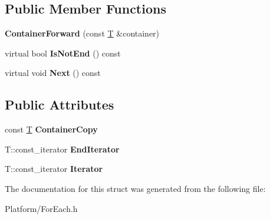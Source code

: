 \subsection*{Public Member Functions}
\begin{DoxyCompactItemize}
\item 
\mbox{\label{struct_gost_crypt_1_1_for_each_1_1_container_forward_af1bb33840d4c26adac8cb5c34d29076e}} 
{\bfseries Container\+Forward} (const \hyperlink{_stribog_8c_aba2f4c400d7a4c0bf0296be622087314}{T} \&container)
\item 
\mbox{\label{struct_gost_crypt_1_1_for_each_1_1_container_forward_a438400d1b3103255f8f26649b8903a02}} 
virtual bool {\bfseries Is\+Not\+End} () const
\item 
\mbox{\label{struct_gost_crypt_1_1_for_each_1_1_container_forward_a1488b7586769ff271884d21c1dd44a11}} 
virtual void {\bfseries Next} () const
\end{DoxyCompactItemize}
\subsection*{Public Attributes}
\begin{DoxyCompactItemize}
\item 
\mbox{\label{struct_gost_crypt_1_1_for_each_1_1_container_forward_ab4189eaa4bcb0fc968ffaf50ecbc981c}} 
const \hyperlink{_stribog_8c_aba2f4c400d7a4c0bf0296be622087314}{T} {\bfseries Container\+Copy}
\item 
\mbox{\label{struct_gost_crypt_1_1_for_each_1_1_container_forward_ae498fa2c981175a88be29f18c5fc91b7}} 
T\+::const\+\_\+iterator {\bfseries End\+Iterator}
\item 
\mbox{\label{struct_gost_crypt_1_1_for_each_1_1_container_forward_a03795c535997333feef935669327a696}} 
T\+::const\+\_\+iterator {\bfseries Iterator}
\end{DoxyCompactItemize}


The documentation for this struct was generated from the following file\+:\begin{DoxyCompactItemize}
\item 
Platform/For\+Each.\+h\end{DoxyCompactItemize}
